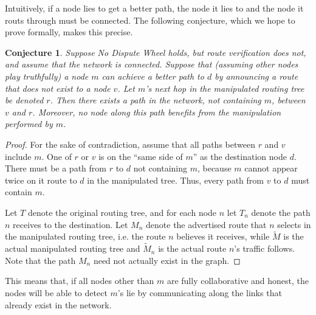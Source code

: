 \documentclass[12pt]{article}
\newtheorem{conjecture}{Conjecture}
\begin{document}
  Intuitively, if a node lies to get a better path, the node it lies
  to and the node it routs through must be connected.
  The following conjecture, which we hope to prove formally,
  makes this precise.
  \begin{conjecture}
    Suppose No Dispute Wheel holds, but route verification does not, and
    assume that the network is connected.
    Suppose that (assuming other nodes play truthfully)
    a node $m$ can achieve a better path to $d$ by announcing
    a route that does not exist to a node $v$.
    Let $m$'s next hop in the manipulated routing tree be denoted $r$.
    Then there exists a path in the network, not containing $m$,
    between $v$ and $r$.
    Moreover, no node along this path benefits from the manipulation
    performed by $m$.
  \end{conjecture}
  \begin{proof}
    For the sake of contradiction, assume that all paths between $r$
    and $v$ include $m$.
    One of $r$ or $v$ is on the ``same side of $m$'' as the destination
    node $d$.
    There must be a path from $r$ to $d$ not containing $m$,
    because $m$ cannot appear twice on it route to $d$ in the manipulated tree.
    Thus, every path from $v$ to $d$ must contain $m$.

    Let $T$ denote the original routing tree, and for each node $n$
    let $T_n$ denote the path $n$ receives to the destination.
    Let $M_n$ denote the advertised route that $n$ selects in the manipulated
    routing tree, i.e. the route $n$ believes it receives,
    while $\widetilde M$ is the actual manipulated routing tree and 
    $\widetilde M_n$ is the actual route $n$'s traffic follows.
    Note that the path $M_n$ need not actually exist in the graph.
  \end{proof}

  This means that, if all nodes other than $m$ are fully collaborative and
  honest, the nodes will be able to detect $m$'s lie
  by communicating along the links that already exist in the network.
\end{document}
